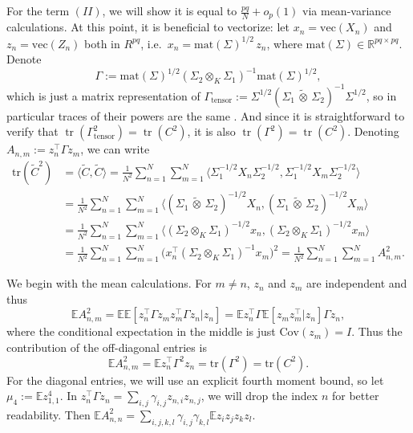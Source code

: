 \documentclass[12pt]{article}
\newcommand{\E}{\mathbb{E}}
\newcommand{\R}{\mathbb{R}}
\renewcommand{\vec}{\mathrm{vec}}
\newcommand{\mat}{\mathrm{mat}}
\newcommand{\tr}{\operatorname{tr}}
\newcommand{\ot}{\,\tilde\otimes\,}
\begin{document}
For the term $(II)$, we will show it is equal to $\frac{pq}{N} + o_p(1)$ via mean-variance calculations. At this point, it is beneficial to vectorize: let $x_n = \vec(X_n)$ and $z_n = \vec(Z_n)$ both in $R^{pq}$, i.e.~$x_n = \mat(\Sigma)^{1/2}\, z_n$, where $\mat(\Sigma) \in \R^{pq \times pq}$. Denote
\[
\Gamma := \mat(\Sigma)^{1/2} (\Sigma_2 \otimes_K \Sigma_1)^{-1}\mat(\Sigma)^{1/2},
\]
which is just a matrix representation of $\Gamma_{\mathrm{tensor}} := \Sigma^{1/2} (\Sigma_1 \ot \Sigma_2)^{-1}\Sigma^{1/2}$, so in particular traces of their powers are the same \citep{golub2013matrix}. And since it is straightforward to verify that $\tr(\Gamma_\mathrm{tensor}^2)=\tr(C^2)$, it is also $\tr(\Gamma^2)=\tr(C^2)$. Denoting $A_{n,m} := z_n^\top \Gamma z_m$, we can write
\[
\begin{split}
\mathrm{tr}(\widetilde C^2) &= \langle \widetilde C, \widetilde C \rangle = \frac{1}{N^2} \sum_{n=1}^N \sum_{m=1}^N \langle {\Sigma}_1^{-1/2} X_n {\Sigma}_2^{-1/2}, {\Sigma}_1^{-1/2} X_m {\Sigma}_2^{-1/2} \rangle \\
&= \frac{1}{N^2} \sum_{n=1}^N \sum_{m=1}^N \langle ({\Sigma}_1 \ot {\Sigma}_2)^{-1/2} X_n , ({\Sigma}_1 \ot {\Sigma}_2)^{-1/2} X_m \rangle\\
&= \frac{1}{N^2} \sum_{n=1}^N \sum_{m=1}^N \langle ({\Sigma}_2 \otimes_K {\Sigma}_1)^{-1/2} x_n , ({\Sigma}_2 \otimes_K {\Sigma}_1)^{-1/2} x_m \rangle \\
&= \frac{1}{N^2} \sum_{n=1}^N \sum_{m=1}^N \big(x_n^\top (\Sigma_2 \otimes_K \Sigma_1)^{-1} x_m\big)^2= \frac{1}{N^2} \sum_{n=1}^N \sum_{m=1}^N A_{n,m}^2.
\end{split}
\]

We begin with the mean calculations. For $m\neq n$, $z_n$ and $z_m$ are independent and thus
\[
\mathbb{E}A_{n,m}^2 = \mathbb{E} \mathbb{E} [z_n^\top \Gamma z_m z_m^\top \Gamma z_n| z_n] = \mathbb{E}z_n^\top \Gamma \mathbb{E}[z_m z_m^\top|z_n] \Gamma z_n,
\]
where the conditional expectation in the middle is just $\mathrm{Cov}(z_m)=I$. Thus the contribution of the off-diagonal entries is
\[
\mathbb{E}A_{n,m}^2 = \mathbb{E}z_n^\top \Gamma^2 z_n = \mathrm{tr}(\Gamma^2)=\mathrm{tr}(C^2).
\]
For the diagonal entries, we will use an explicit fourth moment bound, so let $\mu_4:=\E z_{1,1}^4$. In $z_n^\top \Gamma z_n=\sum_{i,j} \gamma_{i,j} z_{n,i}z_{n,j}$, we will drop the index $n$ for better readability. Then $\E A_{n,n}^2 = \sum_{i,j,k,l} \gamma_{i,j} \gamma_{k,l} \E z_i z_j z_k z_l$.
\end{document}
